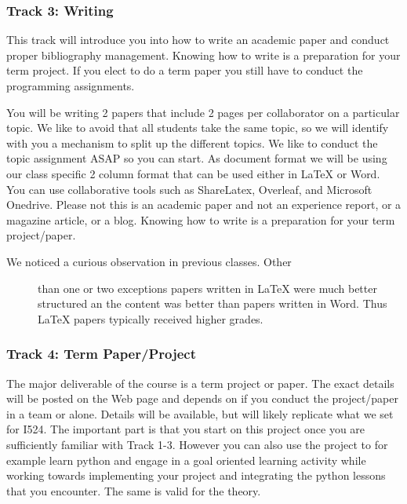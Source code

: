 \subsubsection{Track 3: Writing}\label{track-3-writing}

This track will introduce you into how to write an academic paper and
conduct proper bibliography management. Knowing how to write is a
preparation for your term project. If you elect to do a term paper you
still have to conduct the programming assignments.

You will be writing 2 papers that include 2 pages per collaborator on a
particular topic. We like to avoid that all students take the same
topic, so we will identify with you a mechanism to split up the
different topics. We like to conduct the topic assignment ASAP so you
can start. As document format we will be using our class specific 2
column format that can be used either in LaTeX or Word. You can use
collaborative tools such as ShareLatex, Overleaf, and Microsoft
Onedrive. Please not this is an academic paper and not an experience
report, or a magazine article, or a blog. Knowing how to write is a
preparation for your term project/paper.

\begin{description}
\item[We noticed a curious observation in previous classes. Other]
than one or two exceptions papers written in LaTeX were much better
structured an the content was better than papers written in Word. Thus
LaTeX papers typically received higher grades.
\end{description}

\subsubsection{Track 4: Term
Paper/Project}\label{track-4-term-paperproject}

The major deliverable of the course is a term project or paper. The
exact details will be posted on the Web page and depends on if you
conduct the project/paper in a team or alone. Details will be available,
but will likely replicate what we set for I524. The important part is
that you start on this project once you are sufficiently familiar with
Track 1-3. However you can also use the project to for example learn
python and engage in a goal oriented learning activity while working
towards implementing your project and integrating the python lessons
that you encounter. The same is valid for the theory.

